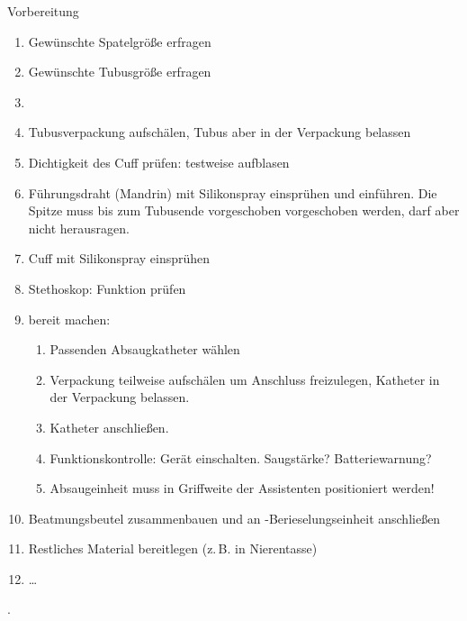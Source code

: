 \documentclass[
ngerman,
paper=a4,
asymmetric,
fontsize=10pt,
draft=false,
numbers=noenddot,
bibtotocnumbered,
footnotes=multiple,
]{scrreprt}
\begin{document}
 \begin{ProcedureStepsWide}{Vorbereitung}
 \begin{enumerate}
   \item Gewünschte Spatelgröße erfragen
   \item Gewünschte Tubusgröße erfragen
  \item {}
  
   \item Tubusverpackung aufschälen, Tubus aber in der Verpackung belassen
   \item Dichtigkeit des Cuff prüfen: testweise aufblasen
   \item Führungsdraht (Mandrin) mit Silikonspray
   einsprühen und
   einführen. Die Spitze muss bis zum Tubusende vorgeschoben vorgeschoben
   werden, darf aber nicht herausragen.
   \item Cuff mit Silikonspray einsprühen
   \item Stethoskop: Funktion prüfen
   \item {} bereit machen:
   \begin{enumerate}
     \item Passenden Absaugkatheter wählen
     \item Verpackung teilweise aufschälen um Anschluss
     freizulegen, Katheter in der Verpackung belassen.
     \item Katheter anschließen.
     \item Funktionskontrolle: Gerät einschalten. Saugstärke?
     Batteriewarnung?
     \item Absaugeinheit muss in Griffweite der Assistenten positioniert werden!
   \end{enumerate}
   \item Beatmungsbeutel zusammenbauen und an
   -Berieselungseinheit anschließen
   \item Restliches Material bereitlegen (z.\,B. in Nierentasse)
  \item \ldots
 \end{enumerate}
 \end{ProcedureStepsWide}.
\end{document}

